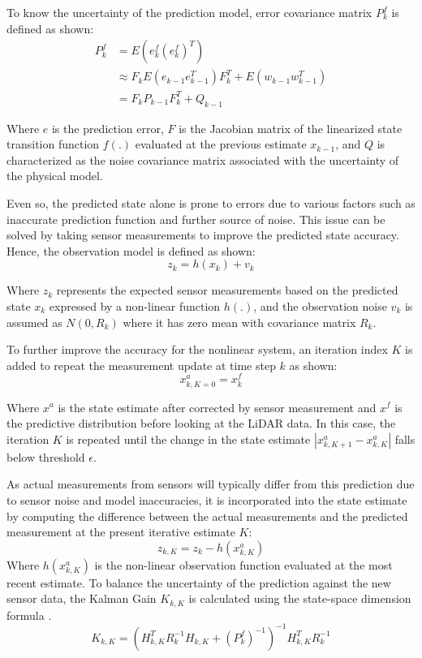 \documentclass[12pt, a4paper]{article}
\begin{document}
To know the uncertainty of the prediction model, error covariance matrix $P^f_k$
is defined as shown:
\begin{align}
    P_k^f &= E\left(e_k^f(e_k^f)^T\right) \nonumber \\
    &\approx F_k E(e_{k-1}e_{k-1}^T)F_k^T + E(w_{k-1}w_{k-1}^T) \nonumber \\
    &= F_kP_{k-1}F_k^T + Q_{k-1}
\end{align}

Where $e$ is the prediction error, $F$ is the Jacobian matrix of the linearized
state transition function $f(.)$ evaluated at the previous estimate $x_{k-1}$,
and $Q$ is characterized as the noise covariance matrix associated with the
uncertainty of the physical model.

Even so, the predicted state alone is prone to errors due to various
factors such as inaccurate prediction function and further source of noise. This
issue can be solved by taking sensor measurements to improve the predicted state
accuracy. Hence, the observation model is defined as shown:
\begin{equation}
    z_k = h(x_k) + v_k
\end{equation} 

Where $z_k$ represents the expected sensor measurements based on the predicted
state $x_k$ expressed by a non-linear function $h(.)$, and the observation noise
$v_k$ is assumed as $N(0,R_k)$ where it has zero mean with covariance matrix $R_k$.

To further improve the accuracy for the nonlinear system, an iteration index
$K$ is added to repeat the measurement update at time step $k$ as shown:
\begin{equation}
    x^a_{k,K=0} = x^f_k
\end{equation}

Where $x^a$ is the state estimate after corrected by sensor measurement and
$x^f$ is the predictive distribution before looking at the LiDAR data. In this
case, the iteration $K$ is repeated until the change in the state estimate
$|x^a_{k,K+1} - x^a_{k,K}|$ falls below threshold $\epsilon$. 

As actual measurements from sensors will typically differ from this prediction
due to sensor noise and model inaccuracies, it is incorporated into the state
estimate by computing the difference between the actual measurements and the
predicted measurement at the present iterative estimate $K$:
\begin{equation}
    z_{k, K} = z_k - h(x^a_{k, K})
\end{equation}
Where $h(x^a_{k, K})$ is the non-linear observation function evaluated at the
most recent estimate. To balance the uncertainty of the prediction against the
new sensor data, the Kalman Gain $K_{k,K}$ is calculated using the state-space
dimension formula \cite{xu2021fast}.
\begin{equation} 
    K_{k, K} = (H_{k, K}^T R_k^{-1} H_{k, K} + (P_k^f)^{-1})^{-1} H_{k, K}^T R_k^{-1} 
\end{equation}
\end{document}
